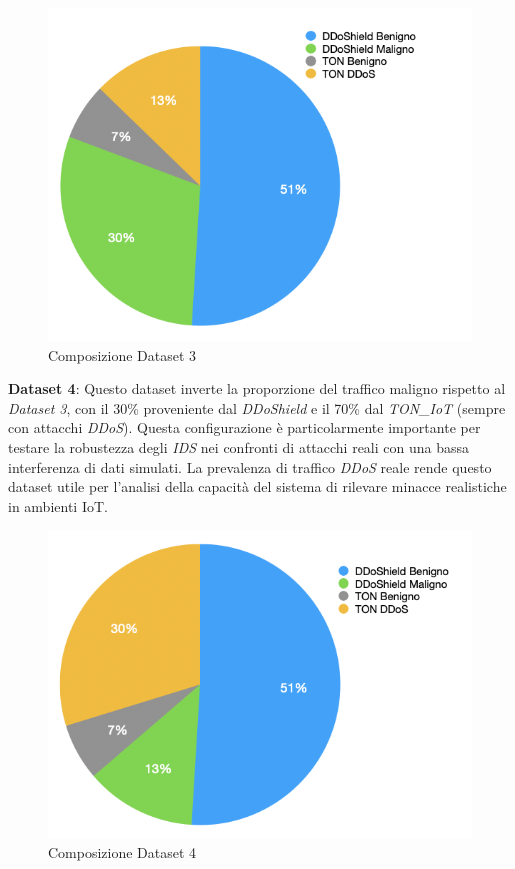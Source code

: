 \begin{figure}[htbp]
\centering
\includegraphics[scale= 0.8]{UNINA_MSc_Thesis_Project/img/chapterRisulati/composizione_DATASET_3.png}
  \caption{Composizione Dataset 3}
\end{figure}

\textbf{Dataset 4}: Questo dataset inverte la proporzione del traffico maligno rispetto al \textit{Dataset 3}, con il 30\% proveniente dal \textit{DDoShield} e il 70\% dal \textit{TON\_IoT} (sempre con attacchi \textit{DDoS}). Questa configurazione è particolarmente importante per testare la robustezza degli \textit{IDS} nei confronti di attacchi reali con una bassa interferenza di dati simulati. La prevalenza di traffico \textit{DDoS} reale rende questo dataset utile per l'analisi della capacità del sistema di rilevare minacce realistiche in ambienti IoT.

\begin{figure}[htbp]
\centering
\includegraphics[scale= 0.8]{UNINA_MSc_Thesis_Project/img/chapterRisulati/composizione_DATASET_4.png}
  \caption{Composizione Dataset 4}
\end{figure}

